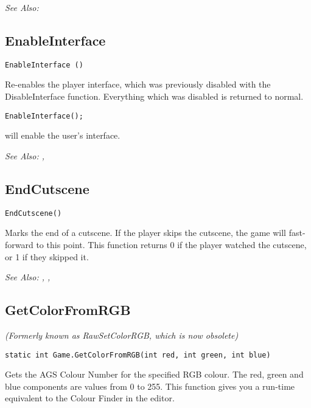 \it{See Also:} 


\subsection{EnableInterface}\label{EnableInterface}%

\begin{verbatim}
EnableInterface ()
\end{verbatim}
Re-enables the player interface, which was previously disabled with
the DisableInterface function. Everything which was disabled is returned
to normal.

\begin{verbatim}
EnableInterface();
\end{verbatim}
will enable the user's interface.

\it{See Also:} , 


\subsection{EndCutscene}\label{EndCutscene}%

\begin{verbatim}
EndCutscene()
\end{verbatim}

Marks the end of a cutscene. If the player skips the cutscene, the game will
fast-forward to this point. This function returns 0 if the player watched the cutscene,
or 1 if they skipped it.

\it{See Also:} ,
,


\subsection{GetColorFromRGB}\label{Game.GetColorFromRGB}%

\it{(Formerly known as RawSetColorRGB, which is now obsolete)}

\begin{verbatim}
static int Game.GetColorFromRGB(int red, int green, int blue)
\end{verbatim}
Gets the AGS Colour Number for the specified RGB colour. The red, green and blue
components are values from 0 to 255. This function gives you a run-time equivalent
to the Colour Finder in the editor.

